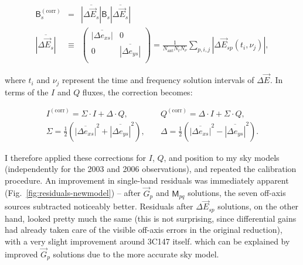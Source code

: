 \documentclass[]{aa}
\newcommand{\matrixtt}[4]{\left( \begin{array}{cc}#1&#2\\#3&#4\\\end{array} \right)}
\newcommand{\jones}[2]{\vec {#1}_{#2}}
\newcommand{\coh}[2]{\mathsf{{#1}}_{{#2}}}
\begin{document}
\begin{eqnarray*}
\coh{B}{s}^\mathrm{(corr)} & = & \overline{|\Delta\jones{E}{s}|} \coh{B}{s} \overline{|\Delta\jones{E}{s}|} \\
\overline{|\Delta\jones{E}{s}|} & \equiv & \matrixtt{\overline{|\Delta e_{xs}|}}{0}{0}{\overline{|\Delta e_{ys}|}} = \frac{1}{N_\mathrm{ant}N_t N_\nu} \sum_{p,i,j} |\Delta\jones{E}{sp}(t_i,\nu_j)|,
\end{eqnarray*}

where $t_i$ and $\nu_j$ represent the time and frequency solution intervals of $\Delta\jones{E}{}$. In terms of the $I$ and $Q$ fluxes, the correction becomes:

\begin{eqnarray*}
I^\mathrm{(corr)} = \Sigma \cdot I + \Delta \cdot Q, & \; &  Q^\mathrm{(corr)} = \Delta \cdot I + \Sigma \cdot Q, \\
\Sigma = \frac{1}{2}\left( \overline{|\Delta e_{xs}|}^2 + \overline{|\Delta e_{ys}|}^2 \right), 
& \; & \Delta = \frac{1}{2}\left( \overline{|\Delta e_{xs}|}^2 - \overline{|\Delta e_{ys}|}^2 \right).
\end{eqnarray*}

I therefore applied these corrections for $I$, $Q$, and position to my sky models (independently for the 2003 and 2006 observations), and repeated the calibration procedure. An improvement in single-band residuals was immediately apparent (Fig.~\ref{fig:residuals-newmodel}) -- after $\jones{G}{p}$ and $\coh{M}{pq}$ solutions, the seven off-axis sources subtracted noticeably better. Residuals after $\Delta\jones{E}{sp}$ solutions, on the other hand, looked pretty much the same (this is not surprising, since differential gains had already taken care of the visible off-axis errors in the original reduction), with a very slight improvement around 3C147 itself. 
which can be explained by improved $\jones{G}{p}$ solutions due to the more accurate sky model.
\end{document}

